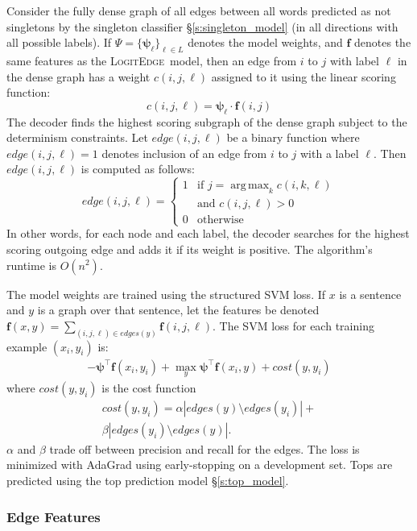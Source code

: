 \documentclass[11pt]{article}
\DeclareMathOperator*{\argmax}{arg\,max}
\newcommand{\logitedge}{\textsc{LogitEdge}}
\begin{document}
Consider the fully dense graph of all edges between all words predicted
as not singletons by the singleton classifier \S\ref{s:singleton_model} (in all
directions with all possible labels).
If $\Psi = \{\bm\psi_\ell\}_{\ell \in L}$ denotes the model
weights, and $\bm{f}$ denotes the same features as the
\logitedge~model, then an edge from $i$ to $j$ with label $\ell$ in the
dense graph has a weight $c(i,j,\ell)$ assigned to it using the linear
scoring function:
\[
c(i,j,\ell) = \bm\psi_\ell \cdot \bm{f}(i,j)
\]
The decoder finds the highest scoring subgraph of the dense graph
subject to the determinism constraints.  Let $edge(i,j,\ell)$ be a
binary function where $edge(i,j,\ell) = 1 $ denotes inclusion of an edge
from $i$ to $j$ with a label $\ell$.  Then $edge(i,j,\ell)$ is computed
as follows:
\[
edge(i,j,\ell) =
\begin{cases}
1 & \text{if } j = \argmax_{k} c(i,k,\ell) \\
& \text{and } c(i,j,\ell) > 0 \\
0 & \text{otherwise}
\end{cases}
\]
In other words, for each node and each label, the decoder searches for
the highest scoring outgoing edge and adds it if its weight is
positive.  The algorithm's runtime is $O(n^2)$.

The model weights are trained using the structured SVM loss.  If $x$
is a sentence and $y$ is a graph over that sentence, let the features 
be denoted $\bm{f}(x,y) = \sum_{(i,j,\ell) \in edges(y)}
\bm{f}(i,j,\ell)$.  The SVM loss for each training example $(x_i, y_i)$ is:
\begin{multline*}
-\bm\psi^\top \bm{f}(x_i,y_i) + \max_{y} \bm\psi^\top \bm{f}(x_i,y) +
cost(y,y_i)
\end{multline*}
where $cost(y,y_i)$
is the cost function
\begin{multline*}
cost(y,y_i) = \alpha |edges(y)\setminus edges(y_i)| + \\
\beta |edges(y_i)\setminus edges(y)|.
\end{multline*}
$\alpha$ and $\beta$ trade off between precision and recall for the
edges.  The loss is minimized with AdaGrad
using early-stopping on a development set.  Tops are predicted using the
top prediction model \S\ref{s:top_model}.


\subsubsection{Edge Features}
\label{s:edgefeatures}
\end{document}
